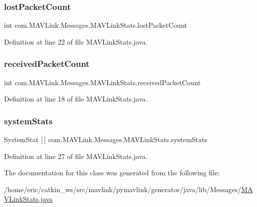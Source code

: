 \subsubsection{\texorpdfstring{lostPacketCount}{lostPacketCount}}
{\footnotesize\ttfamily int com.\+M\+A\+V\+Link.\+Messages.\+M\+A\+V\+Link\+Stats.\+lost\+Packet\+Count}



Definition at line 22 of file M\+A\+V\+Link\+Stats.\+java.

\mbox{\label{classcom_1_1MAVLink_1_1Messages_1_1MAVLinkStats_a019b6f44a6f08c0ed84d197ca08942a1}} 
\subsubsection{\texorpdfstring{receivedPacketCount}{receivedPacketCount}}
{\footnotesize\ttfamily int com.\+M\+A\+V\+Link.\+Messages.\+M\+A\+V\+Link\+Stats.\+received\+Packet\+Count}



Definition at line 18 of file M\+A\+V\+Link\+Stats.\+java.

\mbox{\label{classcom_1_1MAVLink_1_1Messages_1_1MAVLinkStats_af5f6d4b3c54f7c68b928c3bfd3286452}} 
\subsubsection{\texorpdfstring{systemStats}{systemStats}}
{\footnotesize\ttfamily System\+Stat \mbox{[}$\,$\mbox{]} com.\+M\+A\+V\+Link.\+Messages.\+M\+A\+V\+Link\+Stats.\+system\+Stats}



Definition at line 27 of file M\+A\+V\+Link\+Stats.\+java.



The documentation for this class was generated from the following file\+:\begin{DoxyCompactItemize}
\item 
/home/eric/catkin\+\_\+ws/src/mavlink/pymavlink/generator/java/lib/\+Messages/\mbox{\hyperlink{MAVLinkStats_8java}{M\+A\+V\+Link\+Stats.\+java}}\end{DoxyCompactItemize}
